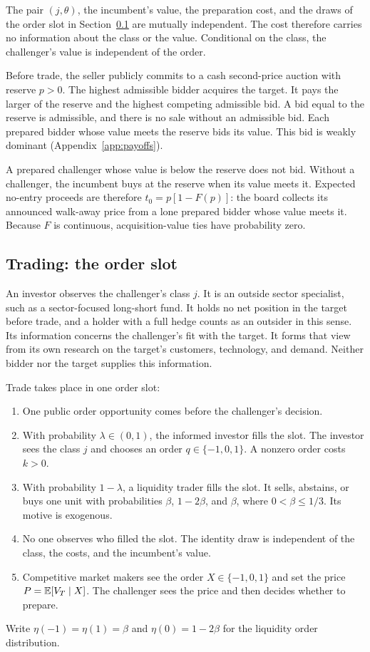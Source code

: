 The pair \((j,\theta)\), the incumbent's value, the preparation cost, and the draws of the order slot in
Section~\ref{sec:slot} are mutually independent. The cost therefore carries no information about the class or
the value. Conditional on the class, the challenger's value is independent of the order.

Before trade, the seller publicly commits to a cash second-price auction with reserve \(p>0\). The highest
admissible bidder acquires the target. It pays the larger of the reserve and the highest competing admissible
bid. A bid equal to the reserve is admissible, and there is no sale without an admissible bid. Each prepared
bidder whose value meets the reserve bids its value. This bid is weakly dominant (Appendix~\ref{app:payoffs}).

A prepared challenger whose value is below the reserve does not bid. Without a challenger, the incumbent buys
at the reserve when its value meets it. Expected no-entry proceeds are therefore \(t_0=p[1-F(p)]\): the board
collects its announced walk-away price from a lone prepared bidder whose value meets it. Because \(F\) is
continuous, acquisition-value ties have probability zero.

\subsection{Trading: the order slot}\label{sec:slot}

An investor observes the challenger's class \(j\). It is an outside sector specialist, such as a
sector-focused long-short fund. It holds no net position in the target before trade, and a holder with a full
hedge counts as an outsider in this sense. Its information concerns the challenger's fit with the target. It
forms that view from its own research on the target's customers, technology, and demand. Neither bidder nor the
target supplies this information.

Trade takes place in one order slot:
\begin{enumerate}[label=(\arabic*),leftmargin=2.5em]
\item One public order opportunity comes before the challenger's decision.
\item With probability \(\lambda\in(0,1)\), the informed investor fills the slot. The investor sees the class
\(j\) and chooses an order \(q\in\{-1,0,1\}\). A nonzero order costs \(k>0\).
\item With probability \(1-\lambda\), a liquidity trader fills the slot. It sells, abstains, or buys one unit
with probabilities \(\beta\), \(1-2\beta\), and \(\beta\), where \(0<\beta\le1/3\). Its motive is exogenous.
\item No one observes who filled the slot. The identity draw is independent of the class, the costs, and the
incumbent's value.
\item Competitive market makers see the order \(X\in\{-1,0,1\}\) and set the price
\(P=\mathbb{E}[V_T\mid X]\). The challenger sees the price and then decides whether to prepare.
\end{enumerate}
Write \(\eta(-1)=\eta(1)=\beta\) and \(\eta(0)=1-2\beta\) for the liquidity order distribution.

